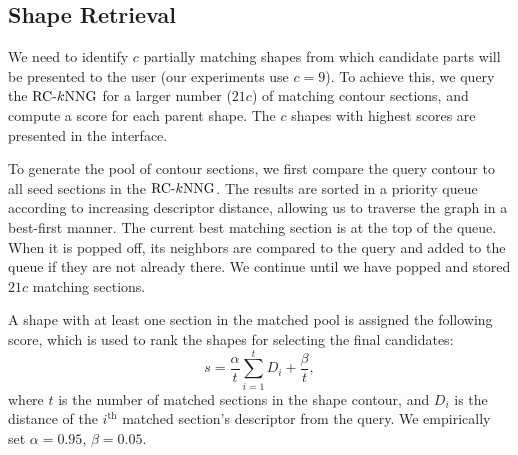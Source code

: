 \subsection{Shape Retrieval}
We need to identify $c$ partially matching shapes from which candidate parts will be presented to the user (our experiments use $c = 9$). To achieve this, we query the ${\mbox{RC-$k$NNG}}$ for a larger number ($21c$) of matching contour sections, and compute a score for each parent shape. The $c$ shapes with highest scores are presented in the interface.

To generate the pool of contour sections, we first compare the query contour to all seed sections in the ${\mbox{RC-$k$NNG}}$. The results are sorted in a priority queue according to increasing descriptor distance, allowing us to traverse the graph in a best-first manner. The current best matching section is at the top of the queue. When it is popped off, its neighbors are compared to the query and added to the queue if they are not already there. We continue until we have popped and stored $21c$ matching sections.

A shape with at least one section in the matched pool is assigned the following score, which is used to rank the shapes for selecting the final candidates:
\[
s = \frac{\alpha }{t}\sum\limits_{i = 1}^t {{D_i}}  + \frac{\beta }{t},
\]
where $t$ is the number of matched sections in the shape contour, and $D_i$ is the distance of the $i^{\textrm{th}}$ matched section's descriptor from the query. We empirically set $\alpha = 0.95$, $\beta = 0.05$.
